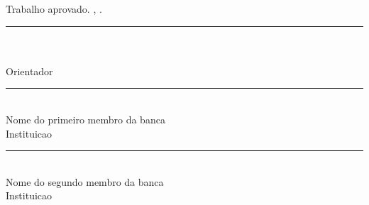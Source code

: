 %

\begin{folhadeaprovacao}
  \begin{center}
    {\ABNTEXchapterfont\large\imprimirautor}

    \vspace*{\fill}\vspace*{\fill}
    \begin{center}
      \ABNTEXchapterfont\bfseries\Large\imprimirtitulo
    \end{center}
    \vspace*{\fill}

    \hspace{.45\textwidth}
    \begin{minipage}{.5\textwidth}
      \SingleSpacing
      \imprimirpreambulo
    \end{minipage}
    \vspace*{\fill}
  \end{center}

  Trabalho aprovado. \lkCity, \lkYear.

  \vspace{1.5cm}

  \begin{center}
    \rule{9cm}{0.4pt} \\
    \lkAdvisor \\
    Orientador \\

    \vspace{1.2cm}
    \rule{9cm}{0.4pt} \\
    Nome do primeiro membro da banca \\
    Instituicao \\

    \vspace{1.2cm}
    \rule{9cm}{0.4pt} \\
    Nome do segundo membro da banca \\
    Instituicao \\
  \end{center}

  \vspace*{\fill}
  \begin{center}
    \lkCity \\
    \lkYear
  \end{center}
\end{folhadeaprovacao}
